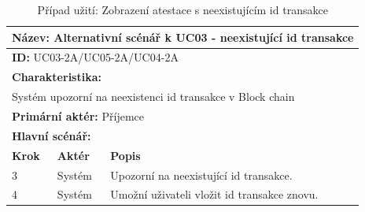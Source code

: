 \vspace{-1mm} %
\renewcommand{\arraystretch}{1.5} %
\begin{table}[h]
	\centering
	\begin{tabular}{|p{1cm}|p{2cm}|p{10cm}|}
		\hline
		\multicolumn{3}{|l|}{\textbf{Název:} Alternativní scénář k UC03 - neexistující id transakce} \\ \hline
		\multicolumn{3}{|l|}{\textbf{ID:} UC03-2A/UC05-2A/UC04-2A} \\ \hline
		\multicolumn{3}{|l|}{\textbf{Charakteristika:}} \\ \hline
		\multicolumn{3}{|l|}{Systém upozorní na neexistenci id transakce v Block chain} \\ \hline
		\multicolumn{3}{|l|}{\textbf{Primární aktér:} Příjemce} \\ \hline
		\multicolumn{3}{|l|}{\textbf{Hlavní scénář:}} \\ \hline
		\textbf{Krok} & \textbf{Aktér} & \textbf{Popis} \\ \hline
		3 & Systém    & Upozorní na neexistující id transakce. \\ \hline
		4 & Systém    & Umožní uživateli vložit id transakce znovu. \\ \hline
		
	\end{tabular}
	\vspace{10pt} %
	\caption{Případ užití: Zobrazení atestace s neexistujícím id transakce}
	\label{tab:usecase-alt-view-attestation}
\end{table}
\renewcommand{\arraystretch}{1} %







